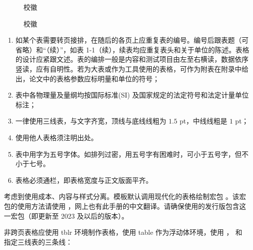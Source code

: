 \begin{texcodeonly}[]{}
  \begin{figure}[h]
    \subfigg    \subfigg
    \subfigg    \subfigg
    \subfigg    \subfigg
    \caption{校徽}
  \end{figure}
\end{texcodeonly}

\begin{figure}[h]
  \subfigg    \subfigg
  \subfigg    \subfigg
  \subfigg    \subfigg
  \caption{校徽}
\end{figure}


\clearpage


\begin{tcolorbox}[colback=red!5!white,colframe=red!75!black]
  \begin{enumerate}[leftmargin=0.5cm]
    \item 如某个表需要转页接排，在随后的各页上应重复表的编号。编号后跟表题（可省略）和“（续）”，如表 1-1（续），续表均应重复表头和关于单位的陈述。表格的设计应紧跟文述。表的编排一般是内容和测试项目由左至右横读，数据依序竖读，应有自明性。若为大表或作为工具使用的表格，可作为附表在附录中给出，论文中的表格参数应标明量和单位的符号；
    \item 表中各物理量及量纲均按国际标准(SI) 及国家规定的法定符号和法定计量单位标注；
    \item 一律使用三线表，与文字齐宽，顶线与底线线粗为 $1.5$ pt，中线线粗是 $1$ pt；
    \item 使用他人表格须注明出处。
    \item 表中用字为五号字体。如排列过密，用五号字有困难时，可小于五号字，但不小于七号。
    \item 表格必须通栏，即表格宽度与正文版面平齐。
  \end{enumerate}
\end{tcolorbox}




考虑到使用成本、内容与样式分离。模板默认调用现代化的表格绘制宏包 。该宏包的使用方法请使用 ，网上也有此手册的中文翻译。请确保使用的发行版包含这一宏包（即更新至 2023 及以后的版本）。

非跨页表格应使用 tblr 环境制作表格，使用 table 作为浮动体环境，使用 \clist{\toprule}，\clist{\midrule} 和 \clist{\bottomrule} 指定三线表的三条线：

